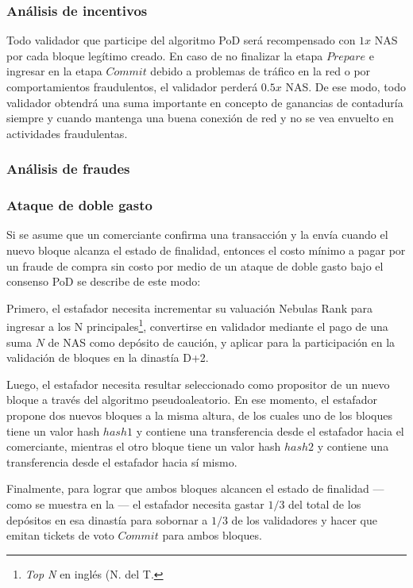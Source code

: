 \subsubsection{Análisis de incentivos}
\label{pod:economic:incentive}

Todo validador que participe del algoritmo PoD será recompensado con $1x$ NAS por cada bloque legítimo creado. En caso de no finalizar la etapa $Prepare$ e ingresar en la etapa $Commit$ debido a problemas de tráfico en la red o por comportamientos fraudulentos, el validador perderá $0.5x$ NAS. De ese modo, todo validador obtendrá una suma importante en concepto de ganancias de contaduría siempre y cuando mantenga una buena conexión de red y no se vea envuelto en actividades fraudulentas.

\subsubsection{Análisis de fraudes}
\label{pod:economic:fraud}

\subsubsection*{Ataque de doble gasto}
\label{pod:economic:fraud:double_spend}

Si se asume que un comerciante confirma una transacción y la envía cuando el nuevo bloque alcanza el estado de finalidad, entonces el costo mínimo a pagar por un fraude de compra sin costo por medio de un ataque de doble gasto bajo el consenso PoD se describe de este modo:

Primero, el estafador necesita incrementar su valuación Nebulas Rank para ingresar a los N principales\footnote{\textit{Top N} en inglés (N. del T.}, convertirse en validador mediante el pago de una suma $N$ de NAS como depósito de caución, y aplicar para la participación en la validación de bloques en la dinastía D+2.

Luego, el estafador necesita resultar seleccionado como propositor de un nuevo bloque a través del algoritmo pseudoaleatorio. En ese momento, el estafador propone dos nuevos bloques a la misma altura, de los cuales uno de los bloques tiene un valor hash $hash1$ y contiene una transferencia desde el estafador hacia el comerciante, mientras el otro bloque tiene un valor hash $hash2$ y contiene una transferencia desde el estafador hacia sí mismo.

Finalmente, para lograr que ambos bloques alcancen el estado de finalidad —como se muestra en la  — el estafador necesita gastar $1/3$ del total de los depósitos en esa dinastía para sobornar a $1/3$ de los validadores y hacer que emitan tickets de voto $Commit$ para ambos bloques.

